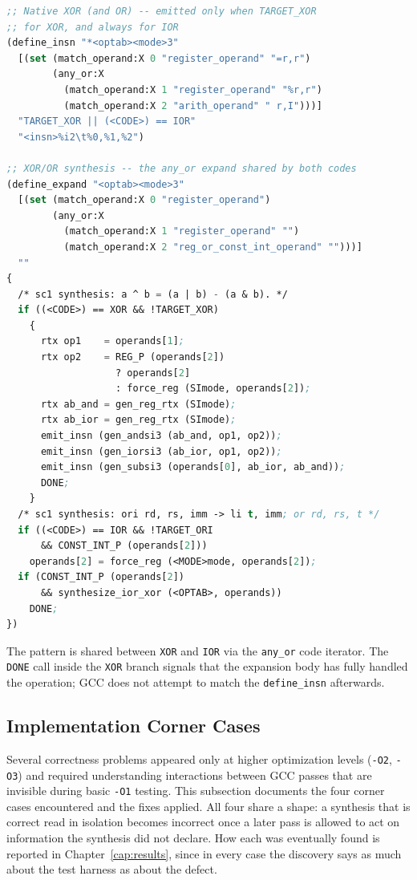 \begin{lstlisting}[language=Lisp]
;; Native XOR (and OR) -- emitted only when TARGET_XOR
;; for XOR, and always for IOR
(define_insn "*<optab><mode>3"
  [(set (match_operand:X 0 "register_operand" "=r,r")
        (any_or:X
          (match_operand:X 1 "register_operand" "%r,r")
          (match_operand:X 2 "arith_operand" " r,I")))]
  "TARGET_XOR || (<CODE>) == IOR"
  "<insn>%i2\t%0,%1,%2")

;; XOR/OR synthesis -- the any_or expand shared by both codes
(define_expand "<optab><mode>3"
  [(set (match_operand:X 0 "register_operand")
        (any_or:X
          (match_operand:X 1 "register_operand" "")
          (match_operand:X 2 "reg_or_const_int_operand" "")))]
  ""
{
  /* sc1 synthesis: a ^ b = (a | b) - (a & b). */
  if ((<CODE>) == XOR && !TARGET_XOR)
    {
      rtx op1    = operands[1];
      rtx op2    = REG_P (operands[2])
                   ? operands[2]
                   : force_reg (SImode, operands[2]);
      rtx ab_and = gen_reg_rtx (SImode);
      rtx ab_ior = gen_reg_rtx (SImode);
      emit_insn (gen_andsi3 (ab_and, op1, op2));
      emit_insn (gen_iorsi3 (ab_ior, op1, op2));
      emit_insn (gen_subsi3 (operands[0], ab_ior, ab_and));
      DONE;
    }
  /* sc1 synthesis: ori rd, rs, imm -> li t, imm; or rd, rs, t */
  if ((<CODE>) == IOR && !TARGET_ORI
      && CONST_INT_P (operands[2]))
    operands[2] = force_reg (<MODE>mode, operands[2]);
  if (CONST_INT_P (operands[2])
      && synthesize_ior_xor (<OPTAB>, operands))
    DONE;
})
\end{lstlisting}

The pattern is shared between \texttt{XOR} and \texttt{IOR} via the \texttt{any\_or} code iterator.
The \texttt{DONE} call inside the \texttt{XOR} branch signals that the expansion body has fully
handled the operation; GCC does not attempt to match the \texttt{define\_insn} afterwards.

\subsection{Implementation Corner Cases} \label{sec:sc1-corner-cases}

Several correctness problems appeared only at higher optimization levels (\texttt{-O2},
\texttt{-O3}) and required understanding interactions between GCC passes that are invisible during
basic \texttt{-O1} testing. This subsection documents the four corner cases encountered and the fixes
applied. All four share a shape: a synthesis that is correct read in isolation becomes incorrect once
a later pass is allowed to act on information the synthesis did not declare. How each was eventually
found is reported in Chapter~\ref{cap:results}, since in every case the discovery says as much about
the test harness as about the defect.

